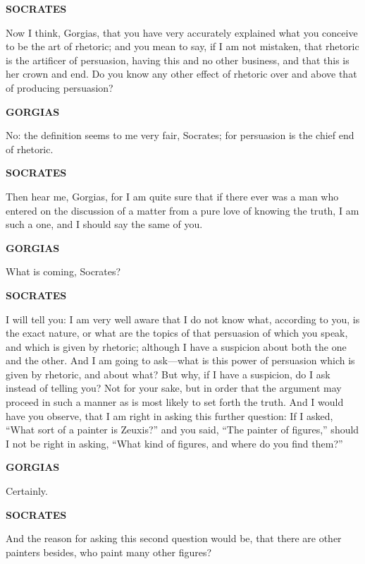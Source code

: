 \documentclass[11pt,letter]{article}
\begin{document}
\par \textbf{SOCRATES}
\par   Now I think, Gorgias, that you have very accurately explained what you conceive to be the art of rhetoric; and you mean to say, if I am not mistaken, that rhetoric is the artificer of persuasion, having this and no other business, and that this is her crown and end. Do you know any other effect of rhetoric over and above that of producing persuasion?

\par \textbf{GORGIAS}
\par   No:  the definition seems to me very fair, Socrates; for persuasion is the chief end of rhetoric.

\par \textbf{SOCRATES}
\par   Then hear me, Gorgias, for I am quite sure that if there ever was a man who entered on the discussion of a matter from a pure love of knowing the truth, I am such a one, and I should say the same of you.

\par \textbf{GORGIAS}
\par   What is coming, Socrates?

\par \textbf{SOCRATES}
\par   I will tell you:  I am very well aware that I do not know what, according to you, is the exact nature, or what are the topics of that persuasion of which you speak, and which is given by rhetoric; although I have a suspicion about both the one and the other. And I am going to ask—what is this power of persuasion which is given by rhetoric, and about what? But why, if I have a suspicion, do I ask instead of telling you? Not for your sake, but in order that the argument may proceed in such a manner as is most likely to set forth the truth. And I would have you observe, that I am right in asking this further question:  If I asked, “What sort of a painter is Zeuxis?” and you said, “The painter of figures,” should I not be right in asking, “What kind of figures, and where do you find them?”

\par \textbf{GORGIAS}
\par   Certainly.

\par \textbf{SOCRATES}
\par   And the reason for asking this second question would be, that there are other painters besides, who paint many other figures?
\end{document}
